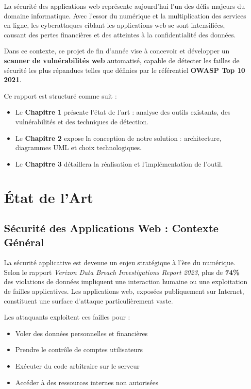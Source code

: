 \documentclass[12pt, a4paper]{report}
\begin{document}
La sécurité des applications web représente aujourd'hui l'un des défis majeurs du
domaine informatique. Avec l'essor du numérique et la multiplication des services
en ligne, les cyberattaques ciblant les applications web se sont intensifiées,
causant des pertes financières et des atteintes à la confidentialité des données.

Dans ce contexte, ce projet de fin d'année vise à concevoir et développer un
\textbf{scanner de vulnérabilités web} automatisé, capable de détecter les failles
de sécurité les plus répandues telles que définies par le référentiel
\textbf{OWASP Top 10 2021}.

Ce rapport est structuré comme suit :
\begin{itemize}[leftmargin=2em, itemsep=3pt]
  \item Le \textbf{Chapitre 1} présente l'état de l'art : analyse des outils
        existants, des vulnérabilités et des techniques de détection.
  \item Le \textbf{Chapitre 2} expose la conception de notre solution : architecture,
        diagrammes UML et choix technologiques.
  \item Le \textbf{Chapitre 3} détaillera la réalisation et l'implémentation
        de l'outil.
\end{itemize}

\newpage

\chapter{État de l'Art}

\onehalfspacing

\section{Sécurité des Applications Web : Contexte Général}

La sécurité applicative est devenue un enjeu stratégique à l'ère du numérique.
Selon le rapport \textit{Verizon Data Breach Investigations Report 2023}, plus de
\textbf{74\%} des violations de données impliquent une interaction humaine ou une
exploitation de failles applicatives. Les applications web, exposées publiquement
sur Internet, constituent une surface d'attaque particulièrement vaste.

Les attaquants exploitent ces failles pour :
\begin{itemize}[leftmargin=2em, itemsep=3pt]
  \item Voler des données personnelles et financières
  \item Prendre le contrôle de comptes utilisateurs
  \item Exécuter du code arbitraire sur le serveur
  \item Accéder à des ressources internes non autorisées
\end{itemize}
\end{document}
